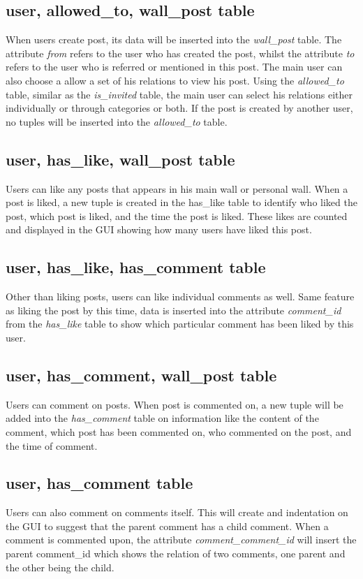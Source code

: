 \subsection{user, allowed\_to, wall\_post table}
When users create post, its data will be inserted into the {\it wall\_post} 
table. The attribute {\it from} refers to the user who has created the post, 
whilst the attribute {\it to} refers to the user who is referred or mentioned 
in this post. The main user can also choose a allow a set of his relations to 
view his post. Using the {\it allowed\_to} table, similar as the 
{\it is\_invited} table, the main user can select his relations either 
individually or through categories or both. If the post is created by another 
user, no tuples will be inserted into the {\it allowed\_to} table.

\subsection{user, has\_like, wall\_post table}
Users can like any posts that appears in his main wall or personal wall. When a 
post is liked, a new tuple is created in the has\_like table to identify who 
liked the post, which post is liked, and the time the post is liked. These likes 
are counted and displayed in the GUI showing how many users have liked this post.

\subsection{user, has\_like, has\_comment table}
Other than liking posts, users can like individual comments as well. Same 
feature as liking the post by this time, data is inserted into the attribute 
{\it comment\_id} from the {\it has\_like} table to show which particular comment 
has been liked by this user.

\subsection{user, has\_comment, wall\_post table}
Users can comment on posts. When post is commented on, a new tuple will be added 
into the {\it has\_comment} table on information like the content of the comment, 
which post has been commented on, who commented on the post, and the time of 
comment.

\subsection{user, has\_comment table}
Users can also comment on comments itself. This will create and indentation on 
the GUI to suggest that the parent comment has a child comment. When a comment is 
commented upon, the attribute {\it comment\_comment\_id} will insert the parent 
comment\_id which shows the relation of two comments, one parent and the other 
being the child.

